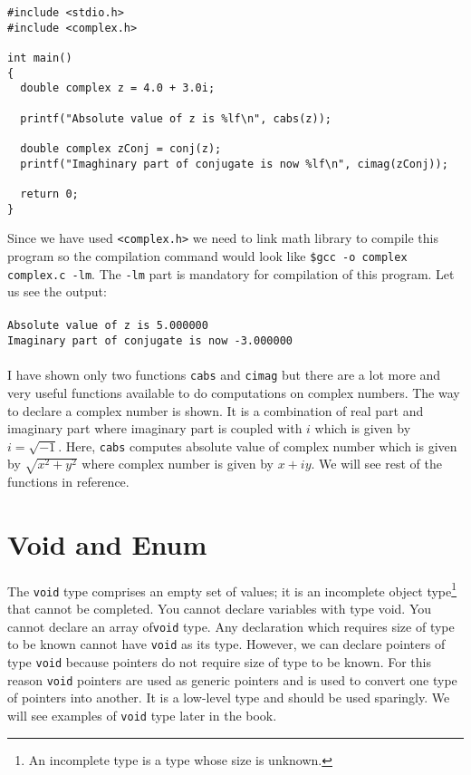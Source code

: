 \begin{verbatim}
#include <stdio.h>
#include <complex.h>

int main()
{
  double complex z = 4.0 + 3.0i;

  printf("Absolute value of z is %lf\n", cabs(z));

  double complex zConj = conj(z);
  printf("Imaghinary part of conjugate is now %lf\n", cimag(zConj));

  return 0;
}
\end{verbatim}

Since we have used \texttt{<complex.h>} we need to link math library to compile
this program so the compilation command would look like \texttt{\$gcc -o complex
complex.c -lm}. The \texttt{-lm} part is mandatory for compilation of this
program. Let us see the output:
\\\\\texttt{Absolute value of z is 5.000000\\
Imaginary part of conjugate is now -3.000000\\\\}
I have shown only two functions \texttt{cabs} and \texttt{cimag} but there are
a lot more and very useful functions available to do computations on complex
numbers. The way to declare a complex number is shown. It is a combination of
real part and imaginary part where imaginary part is coupled with $i$ which is
given by $i = \sqrt{-1}$. Here, \texttt{cabs} computes absolute value of
complex number which is given by $\sqrt{x^2 + y^2}$ where complex number is
given by $x + iy$. We will see rest of the functions in reference.

\section{Void and Enum}
The \texttt{void} type comprises an empty set of values; it is an incomplete
object type\footnote{An incomplete type is a type whose size is unknown.} that
cannot be completed. You cannot declare variables with type void. You cannot
declare an array of\texttt{void} type. Any declaration which requires size of
type to be known cannot have \texttt{void} as its type. However, we can declare
pointers of type \texttt{void} because pointers do not require size of type to
be known. For this reason \texttt{void} pointers are used as generic pointers
and is used to convert one type of pointers into another. It is a low-level
type and should be used sparingly. We will see examples of \texttt{void} type
later in the book.

